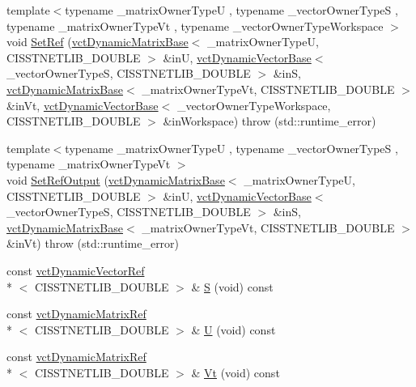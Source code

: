 \begin{DoxyCompactItemize}
{\footnotesize template$<$typename \-\_\-matrix\-Owner\-Type\-U , typename \-\_\-vector\-Owner\-Type\-S , typename \-\_\-matrix\-Owner\-Type\-Vt , typename \-\_\-vector\-Owner\-Type\-Workspace $>$ }\\void \hyperlink{classnmr_s_v_d_dynamic_data_a721078abe670ddb39948e5a234374f05}{Set\-Ref} (\hyperlink{classvct_dynamic_matrix_base}{vct\-Dynamic\-Matrix\-Base}$<$ \-\_\-matrix\-Owner\-Type\-U, C\-I\-S\-S\-T\-N\-E\-T\-L\-I\-B\-\_\-\-D\-O\-U\-B\-L\-E $>$ \&in\-U, \hyperlink{classvct_dynamic_vector_base}{vct\-Dynamic\-Vector\-Base}$<$ \-\_\-vector\-Owner\-Type\-S, C\-I\-S\-S\-T\-N\-E\-T\-L\-I\-B\-\_\-\-D\-O\-U\-B\-L\-E $>$ \&in\-S, \hyperlink{classvct_dynamic_matrix_base}{vct\-Dynamic\-Matrix\-Base}$<$ \-\_\-matrix\-Owner\-Type\-Vt, C\-I\-S\-S\-T\-N\-E\-T\-L\-I\-B\-\_\-\-D\-O\-U\-B\-L\-E $>$ \&in\-Vt, \hyperlink{classvct_dynamic_vector_base}{vct\-Dynamic\-Vector\-Base}$<$ \-\_\-vector\-Owner\-Type\-Workspace, C\-I\-S\-S\-T\-N\-E\-T\-L\-I\-B\-\_\-\-D\-O\-U\-B\-L\-E $>$ \&in\-Workspace)  throw (std\-::runtime\-\_\-error)
\item 
{\footnotesize template$<$typename \-\_\-matrix\-Owner\-Type\-U , typename \-\_\-vector\-Owner\-Type\-S , typename \-\_\-matrix\-Owner\-Type\-Vt $>$ }\\void \hyperlink{classnmr_s_v_d_dynamic_data_a8099ef202b4802eacd56511fc5c393dd}{Set\-Ref\-Output} (\hyperlink{classvct_dynamic_matrix_base}{vct\-Dynamic\-Matrix\-Base}$<$ \-\_\-matrix\-Owner\-Type\-U, C\-I\-S\-S\-T\-N\-E\-T\-L\-I\-B\-\_\-\-D\-O\-U\-B\-L\-E $>$ \&in\-U, \hyperlink{classvct_dynamic_vector_base}{vct\-Dynamic\-Vector\-Base}$<$ \-\_\-vector\-Owner\-Type\-S, C\-I\-S\-S\-T\-N\-E\-T\-L\-I\-B\-\_\-\-D\-O\-U\-B\-L\-E $>$ \&in\-S, \hyperlink{classvct_dynamic_matrix_base}{vct\-Dynamic\-Matrix\-Base}$<$ \-\_\-matrix\-Owner\-Type\-Vt, C\-I\-S\-S\-T\-N\-E\-T\-L\-I\-B\-\_\-\-D\-O\-U\-B\-L\-E $>$ \&in\-Vt)  throw (std\-::runtime\-\_\-error)
\item 
const \hyperlink{classvct_dynamic_vector_ref}{vct\-Dynamic\-Vector\-Ref}\\*
$<$ C\-I\-S\-S\-T\-N\-E\-T\-L\-I\-B\-\_\-\-D\-O\-U\-B\-L\-E $>$ \& \hyperlink{classnmr_s_v_d_dynamic_data_a9ad290536daf096858e7dc9ecb4665f2}{S} (void) const 
\item 
const \hyperlink{classvct_dynamic_matrix_ref}{vct\-Dynamic\-Matrix\-Ref}\\*
$<$ C\-I\-S\-S\-T\-N\-E\-T\-L\-I\-B\-\_\-\-D\-O\-U\-B\-L\-E $>$ \& \hyperlink{classnmr_s_v_d_dynamic_data_ad77c3cbe127481ab64a8f8134ee49045}{U} (void) const 
\item 
const \hyperlink{classvct_dynamic_matrix_ref}{vct\-Dynamic\-Matrix\-Ref}\\*
$<$ C\-I\-S\-S\-T\-N\-E\-T\-L\-I\-B\-\_\-\-D\-O\-U\-B\-L\-E $>$ \& \hyperlink{classnmr_s_v_d_dynamic_data_a611c65dc458f9e976e4b1c52134adfa8}{Vt} (void) const 
\end{DoxyCompactItemize}
